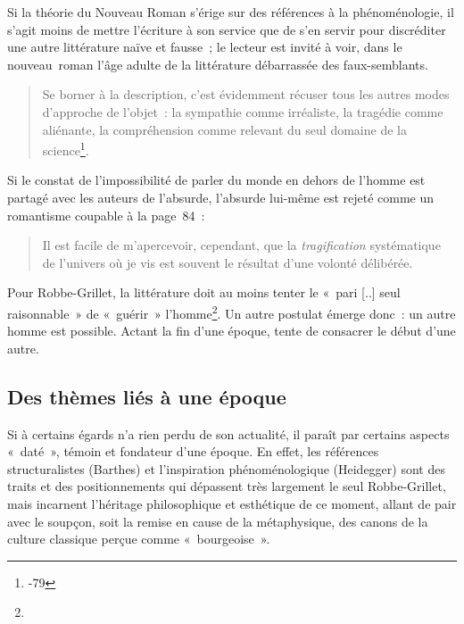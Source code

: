 Si la théorie du Nouveau Roman s'érige sur des références à la phénoménologie, il s'agit moins de mettre l'écriture à son service que de s'en servir pour discréditer une autre littérature naïve et fausse~; le lecteur est invité à voir, dans le nouveau~roman l'âge adulte de la littérature débarrassée des faux-semblants.
\begin{quote}
    Se borner à la description, c’est évidemment récuser tous les autres modes d’approche de l’objet~: la sympathie comme irréaliste, la tragédie comme aliénante, la compréhension comme relevant du seul domaine de la science\footnote{-79}.
\end{quote}

Si le constat de l'impossibilité de parler du monde en dehors de l'homme est partagé avec les auteurs de l'absurde, l'absurde lui-même est rejeté comme un romantisme coupable à la page~84~:
\begin{quote}
    Il est facile de m’apercevoir, cependant, que la \textit{tragification} systématique de l’univers où je vis est souvent le résultat d’une volonté délibérée.
\end{quote}
Pour Robbe-Grillet, la littérature doit au moins tenter le «~pari [..] seul raisonnable~» de «~guérir~» l'homme\footnote{}. Un autre postulat émerge donc~: un autre homme est possible. Actant la fin d'une époque, \punr{} tente de consacrer le début d'une autre.


\subsection{Des thèmes liés à une époque}

Si à certains égards \punr{} n'a rien perdu de son actualité, il paraît par certains aspects «~daté~», témoin et fondateur d'une époque. En effet, les références structuralistes (Barthes) et l'inspiration phénoménologique (Heidegger) sont des traits et des positionnements qui dépassent très largement le seul Robbe-Grillet, mais incarnent l'héritage philosophique et esthétique de ce moment, allant de pair avec le soupçon, soit la remise en cause de la métaphysique, des canons de la culture classique perçue comme «~bourgeoise~».

